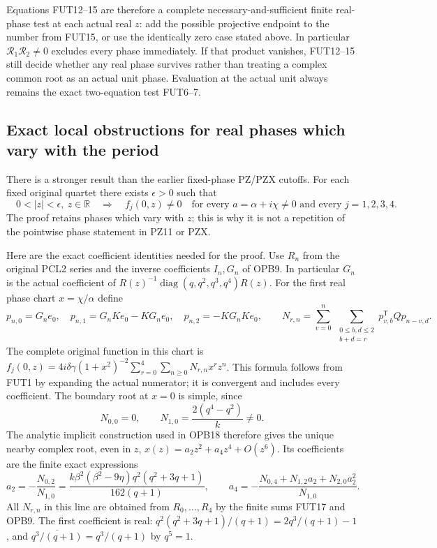 \documentclass[11pt]{article}
\begin{document}
Equations FUT12--15 are therefore a complete necessary-and-sufficient
finite real-phase test at each actual real $z$: add the possible
projective endpoint to the number from FUT15, or use the identically
zero case stated above. In particular $\mathscr R_1\mathscr R_2\ne0$
excludes every phase immediately. If that product vanishes, FUT12--15
still decide whether any real phase survives rather than treating a
complex common root as an actual unit phase. Evaluation at the actual
unit always remains the exact two-equation test FUT6--7.

\subsection{Exact local obstructions for real phases which vary with the period}
There is a stronger result than the earlier fixed-phase PZ/PZX cutoffs.
For each fixed original quartet there exists $\epsilon>0$ such that
\[
 \boxed{\quad
 0<|z|<\epsilon,\ z\in\mathbb R
 \quad\Longrightarrow\quad
 f_j(0,z)\ne0\quad
 \text{for every }a=\alpha+i\chi\ne0
 \text{ and every }j=1,2,3,4.
 \quad}\tag{FUT16}
\]
The proof retains phases which vary with $z$; this is why it is not a
repetition of the pointwise phase statement in PZ11 or PZX.

Here are the exact coefficient identities needed for the proof.
Use $R_n$ from the original PCL2 series and the inverse coefficients
$I_n,G_n$ of OPB9. In particular $G_n$ is the actual coefficient of
$R(z)^{-1}\operatorname{diag}(q,q^2,q^3,q^4)R(z)$.
For the first real phase chart $x=\chi/\alpha$ define
\[
 p_{n,0}=G_ne_0,\quad p_{n,1}=G_nKe_0-KG_ne_0,\quad
 p_{n,2}=-KG_nKe_0,\qquad
 N_{r,n}=\sum_{v=0}^n\ \sum_{\substack{0\le b,d\le2\\b+d=r}}
                 p_{v,b}^{\mathsf T}Qp_{n-v,d}.
 \tag{FUT17}
\]
The complete original function in this chart is
$f_j(0,z)=4i\delta\gamma(1+x^2)^{-2}
\sum_{r=0}^4\sum_{n\ge0}N_{r,n}x^rz^n$.
This formula follows from FUT1 by expanding the actual numerator;
it is convergent and includes every coefficient.
The boundary root at $x=0$ is simple, since
\[
 N_{0,0}=0,\qquad N_{1,0}=\frac{2(q^4-q^2)}k\ne0.
 \tag{FUT18}
\]
The analytic implicit construction used in OPB18 therefore gives the
unique nearby complex root, even in $z$,
$x(z)=a_2z^2+a_4z^4+O(z^6)$. Its coefficients are the finite exact
expressions
\[
 a_2=-\frac{N_{0,2}}{N_{1,0}}
 =\frac{k\beta^2(\beta^2-9\eta)q^2(q^2+3q+1)}{162(q+1)},
 \qquad
 a_4=-\frac{N_{0,4}+N_{1,2}a_2+N_{2,0}a_2^2}{N_{1,0}}.
 \tag{FUT19}
\]
All $N_{r,n}$ in this line are obtained from $R_0,\ldots,R_4$ by
the finite sums FUT17 and OPB9. The first coefficient is real:
$q^2(q^2+3q+1)/(q+1)=2q^3/(q+1)-1$, and
$\overline{q^3/(q+1)}=q^3/(q+1)$ by $q^5=1$.
\end{document}
